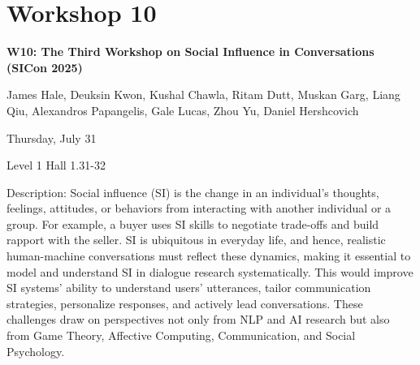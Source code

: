 \clearpage


\section[W10: The Third Workshop on Social Influence in Conversations (SICon 2025)]{Workshop 10}

\begin{center}
    {\Large \textbf{W10: The Third Workshop on Social Influence in Conversations (SICon 2025)}}

    James Hale, Deuksin Kwon, Kushal Chawla, Ritam Dutt, Muskan Garg, Liang Qiu, Alexandros Papangelis, Gale Lucas, Zhou Yu, Daniel Hershcovich

   Thursday, July 31
    
    Level 1 Hall 1.31-32

\end{center}
	
Description: Social influence (SI) is the change in an individual's thoughts, feelings, attitudes, or behaviors from interacting with another individual or a group. For example, a buyer uses SI skills to negotiate trade-offs and build rapport with the seller. SI is ubiquitous in everyday life, and hence, realistic human-machine conversations must reflect these dynamics, making it essential to model and understand SI in dialogue research systematically. This would improve SI systems' ability to understand users’ utterances, tailor communication strategies, personalize responses, and actively lead conversations. These challenges draw on perspectives not only from NLP and AI research but also from Game Theory, Affective Computing, Communication, and Social Psychology.


